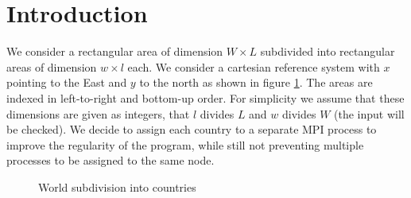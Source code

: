 \section{Introduction}

We consider a rectangular area of dimension $W \times L$ subdivided into rectangular areas of dimension $w \times l$ each. We consider a cartesian reference system with $x$ pointing to the East and $y$ to the north as shown in figure \ref{fig:area_subdivision}. The areas are indexed in left-to-right and bottom-up order.
For simplicity we assume that these dimensions are given as integers, that $l$ divides $L$ and $w$ divides $W$ (the input will be checked).
We decide to assign each country to a separate MPI process to improve the regularity of the program, while still not preventing multiple processes to be assigned to the same node.
\begin{figure}[h]
    \centering
    \begin{subfigure}[c]{0.7\textwidth}
    \end{subfigure}
    \begin{subfigure}[c]{0.29\textwidth}
    \end{subfigure}
    \caption{World subdivision into countries}
    \label{fig:area_subdivision}
\end{figure}


